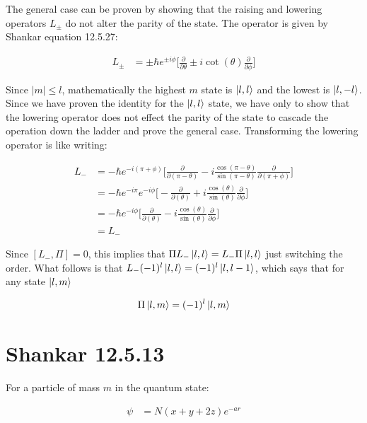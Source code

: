 \documentclass[paper=a4, fontsize=11pt]{scrartcl} %
\numberwithin{equation}{section} %
\numberwithin{figure}{section} %
\numberwithin{table}{section} %
\begin{document}
The general case can be proven by showing that the raising and lowering operators $L_{\pm}$ do not alter the parity of the state. The operator is given by Shankar equation 12.5.27:

\begin{align}
L_{\pm} &= \pm \hbar e^{\pm i \phi} \bigg[\frac{\partial}{\partial \theta} \pm i \cot(\theta) \frac{\partial}{\partial \phi} \bigg]
\end{align} 

Since $|m| \leq l$, mathematically the highest $m$ state is $\ket{l,l}$ and the lowest is $\ket{l,-l}$. Since we have proven the identity for the $\ket{l,l}$ state, we have only to show that the lowering operator does not effect the parity of the state to cascade the operation down the ladder and prove the general case. Transforming the lowering operator is like writing: 

\begin{align}
L_- &= -\hbar e^{- i (\pi + \phi)} \bigg[\frac{\partial}{\partial (\pi - \theta)} - i \frac{\cos(\pi - \theta)}{\sin(\pi - \theta)} \frac{\partial}{\partial (\pi + \phi)} \bigg] \\
&= -\hbar e^{-i \pi}e^{-i \phi}  \bigg[ -\frac{\partial}{\partial (\theta)} + i \frac{\cos(\theta)}{\sin(\theta)} \frac{\partial}{\partial \phi} \bigg] \\
&= -\hbar e^{-i \phi}  \bigg[ \frac{\partial}{\partial (\theta)} - i \frac{\cos(\theta)}{\sin(\theta)} \frac{\partial}{\partial \phi} \bigg] \\
&= L_-
\end{align} 

Since $[L_-, \Pi] = 0$, this implies that $\Pi L_- \ket{l,l} = L_- \Pi \ket{l,l}$ just switching the order. What follows is that $L_- (-1)^l \ket{l,l} = (-1)^l \ket{l,l-1}$, which says that for any state $\ket{l,m}$ 

\begin{align}
\Pi \ket{l,m} = (-1)^l \ket{l,m}  
\end{align}

\section{Shankar 12.5.13}

For a particle of mass $m$ in the quantum state:

\begin{align}
\psi &= N(x + y + 2z)e^{-a r}
\end{align}
\end{document}
